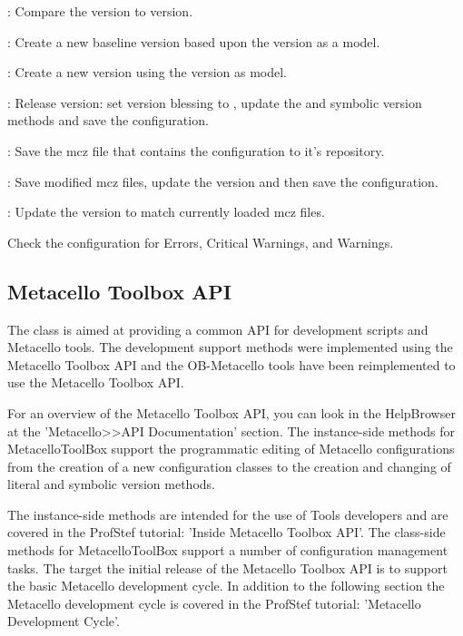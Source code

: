 \documentclass[a4paper,10pt,twoside]{book}
\begin{document}
\begin{description}
\item {}: Compare the  version to  version.
\item {}: Create a new baseline version based upon the  version as a model.
\item {}: Create a new  version using the  version as model.
\item {}: Release  version: set version blessing to , update the  and  symbolic version methods and save the configuration.

\item {}: Save the mcz file that contains the configuration to it's repository.

\item {}: Save modified mcz files, update the  version and then save the configuration.

\item {}: Update the  version to match currently loaded mcz files.

\item {} Check the configuration for Errors, Critical Warnings, and Warnings.
\end{description}

\subsection{Metacello Toolbox API}

The  class is aimed at providing a common API for development scripts and Metacello tools. The development support methods were implemented using the Metacello Toolbox API and the OB-Metacello tools have been reimplemented to use the Metacello Toolbox API.

For an overview of the Metacello Toolbox API, you can look in the HelpBrowser at the 'Metacello>>API Documentation' section. The instance-side methods for MetacelloToolBox support the  programmatic editing of Metacello configurations from the creation of a new configuration classes to the creation and changing of literal and symbolic version methods.

The instance-side methods are intended for the use of Tools developers and are covered in the ProfStef tutorial: 'Inside Metacello Toolbox API'. The class-side methods for MetacelloToolBox support a number of configuration management tasks. The target the initial release of the Metacello Toolbox API is to support the basic Metacello development cycle. In addition to the following section the Metacello development cycle is covered in the ProfStef tutorial: 'Metacello Development Cycle'.
\end{document}
